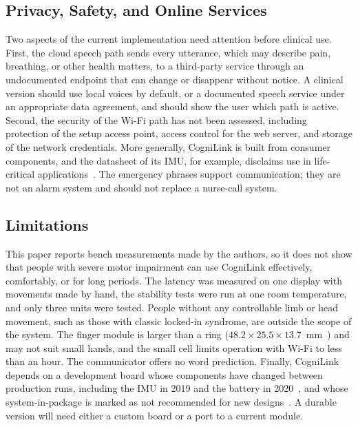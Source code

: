 \documentclass[journal]{IEEEtran}
\begin{document}
\subsection{Privacy, Safety, and Online Services}
\label{sec:privacy}
Two aspects of the current implementation need attention before clinical use. First, the cloud speech path sends every utterance, which may describe pain, breathing, or other health matters, to a third-party service through an undocumented endpoint that can change or disappear without notice. A clinical version should use local voices by default, or a documented speech service under an appropriate data agreement, and should show the user which path is active. Second, the security of the Wi-Fi path has not been assessed, including protection of the setup access point, access control for the web server, and storage of the network credentials. More generally, CogniLink is built from consumer components, and the datasheet of its IMU, for example, disclaims use in life-critical applications~\cite{mpu6886}. The emergency phrases support communication; they are not an alarm system and should not replace a nurse-call system.

\subsection{Limitations}
This paper reports bench measurements made by the authors, so it does not show that people with severe motor impairment can use CogniLink effectively, comfortably, or for long periods. The latency was measured on one display with movements made by hand, the stability tests were run at one room temperature, and only three units were tested. People without any controllable limb or head movement, such as those with classic locked-in syndrome, are outside the scope of the system. The finger module is larger than a ring ($48.2\times25.5\times13.7$~mm~\cite{m5stickc}) and may not suit small hands, and the small cell limits operation with Wi-Fi to less than an hour. The communicator offers no word prediction. Finally, CogniLink depends on a development board whose components have changed between production runs, including the IMU in 2019 and the battery in 2020~\cite{m5stickc}, and whose system-in-package is marked as not recommended for new designs~\cite{esp32picoseries}. A durable version will need either a custom board or a port to a current module.
\end{document}
